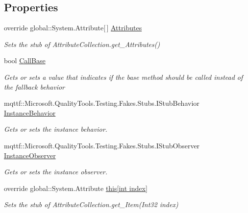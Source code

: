\subsection*{Properties}
\begin{DoxyCompactItemize}
\item 
override global\-::\-System.\-Attribute\mbox{[}$\,$\mbox{]} \hyperlink{class_system_1_1_component_model_1_1_fakes_1_1_stub_attribute_collection_af930d3a75d88ed53e23788b0fdbaa637}{Attributes}
\begin{DoxyCompactList}\small\item\em Sets the stub of Attribute\-Collection.\-get\-\_\-\-Attributes()\end{DoxyCompactList}\item 
bool \hyperlink{class_system_1_1_component_model_1_1_fakes_1_1_stub_attribute_collection_ab75aecc28c0eb27d40e3f231c2ff536c}{Call\-Base}
\begin{DoxyCompactList}\small\item\em Gets or sets a value that indicates if the base method should be called instead of the fallback behavior\end{DoxyCompactList}\item 
mqttf\-::\-Microsoft.\-Quality\-Tools.\-Testing.\-Fakes.\-Stubs.\-I\-Stub\-Behavior \hyperlink{class_system_1_1_component_model_1_1_fakes_1_1_stub_attribute_collection_a126ce11d831e3c9158f2533c8653ba5b}{Instance\-Behavior}
\begin{DoxyCompactList}\small\item\em Gets or sets the instance behavior.\end{DoxyCompactList}\item 
mqttf\-::\-Microsoft.\-Quality\-Tools.\-Testing.\-Fakes.\-Stubs.\-I\-Stub\-Observer \hyperlink{class_system_1_1_component_model_1_1_fakes_1_1_stub_attribute_collection_a0e77f0f447c86dcef3e2d9155d42e76f}{Instance\-Observer}
\begin{DoxyCompactList}\small\item\em Gets or sets the instance observer.\end{DoxyCompactList}\item 
override global\-::\-System.\-Attribute \hyperlink{class_system_1_1_component_model_1_1_fakes_1_1_stub_attribute_collection_a8378139fcac112afc534434a810cc856}{this\mbox{[}int index\mbox{]}}
\begin{DoxyCompactList}\small\item\em Sets the stub of Attribute\-Collection.\-get\-\_\-\-Item(\-Int32 index)\end{DoxyCompactList}\end{DoxyCompactItemize}


